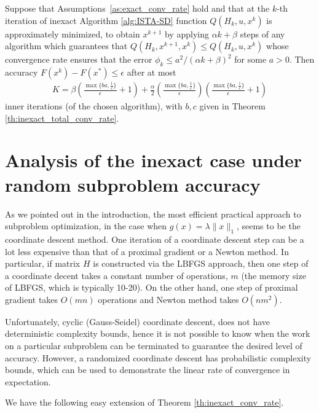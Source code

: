 \documentclass[11pt]{article}
\numberwithin{equation}{section}
\begin{document}
\begin{theorem}\label{th:inexact_total_conv_rate}
Suppose that Assumptions~\ref{as:exact_conv_rate} hold and that at the $k$-th iteration of inexact Algorithm \ref{alg:ISTA-SD} 
function $Q(H_k, u, x^k)$ is approximately minimized, to obtain $x^{k+1}$ by applying $\alpha k+\beta$ steps of any algorithm which guarantees that
 $Q(H_k, x^{k+1}, x^k)\leq Q(H_k, u, x^k)$ whose convergence 
rate ensures that the error $\phi_k\leq a^2/(\alpha k+\beta)^2$ for some $a>0$.  Then accuracy $F(x^k) - F(x^*)\leq \epsilon$  after at most 
\begin{align}
    \label{eq:total_bound_F_F*}
	K=\beta( { \frac{\max\{b a, \frac{1}{c}\}}{\epsilon}} +1)+ \frac{\alpha}{2}({ \frac{\max\{b a, \frac{1}{c}\}}{\epsilon}})({ \frac{\max\{b a, \frac{1}{c}\}}{\epsilon}}+1)
\end{align}
inner iterations (of the chosen algorithm), 
with $b, c$  given in Theorem \ref{th:inexact_total_conv_rate}. 
\end{theorem}

\section{Analysis of the inexact case under random subproblem accuracy}
As we pointed out in the introduction, the most efficient  practical approach to subproblem optimization, in the case when  $g(x)=\lambda \|x\|_1$, seems to be the coordinate descent method. One iteration of a coordinate descent step can be a lot less expensive 
than that of a proximal gradient or a Newton method. In particular, if matrix $H$ is constructed via the LBFGS approach, then one step of a coordinate decent takes a constant number 
of operations, $m$ (the memory size of LBFGS, which is typically 10-20). On the other hand, one step of proximal gradient takes $O(mn)$ operations and Newton method takes $O(nm^2)$. 

Unfortunately,  cyclic (Gauss-Seidel) coordinate descent, does not have deterministic complexity bounds, hence it is not possible to know when the work on a particular subproblem can be terminated to guarantee the desired  level of accuracy. However, a randomized coordinate descent has probabilistic complexity bounds, which can be used to demonstrate the linear rate of convergence in expectation.

We have the following easy extension of Theorem \ref{th:inexact_conv_rate}.
\end{document}
